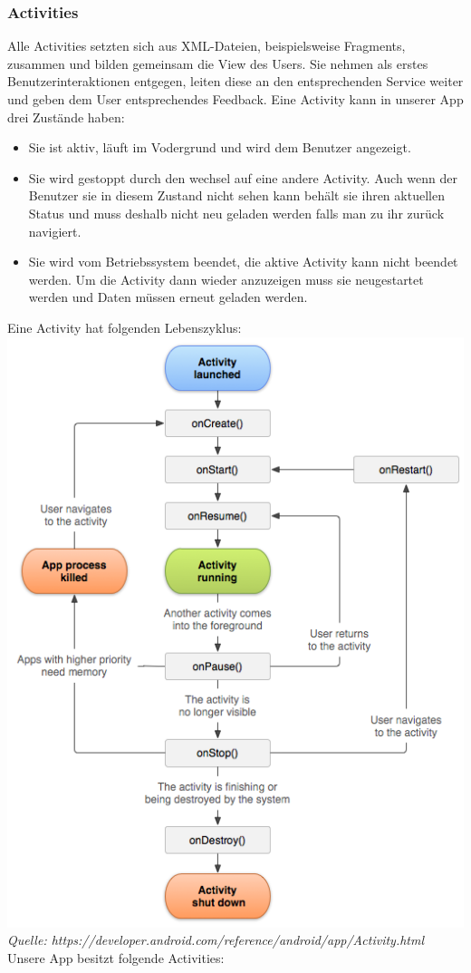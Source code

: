 	\subsubsection{Activities}
Alle Activities setzten sich aus XML-Dateien, beispielsweise Fragments, zusammen und bilden gemeinsam die View des Users.
Sie nehmen als erstes Benutzerinteraktionen entgegen, leiten diese an den entsprechenden Service weiter und geben dem User entsprechendes Feedback.
\newline Eine Activity kann in unserer App drei Zustände haben:
\begin{itemize}
\item Sie ist aktiv, läuft im Vodergrund und wird dem Benutzer angezeigt.
\item Sie wird gestoppt durch den wechsel auf eine andere Activity. Auch wenn der Benutzer sie in diesem Zustand nicht sehen kann behält sie ihren aktuellen Status und muss deshalb nicht neu geladen werden falls man zu ihr zurück navigiert.
\item Sie wird vom Betriebssystem beendet, die aktive Activity kann nicht beendet werden.  Um die Activity dann wieder anzuzeigen muss sie neugestartet werden und Daten müssen erneut geladen werden.
\end{itemize}
Eine Activity hat folgenden Lebenszyklus:\newline
\includegraphics[width=.9\textwidth]{activity_lifecycle.png}
\textit{Quelle: https://developer.android.com/reference/android/app/Activity.html}
Unsere App besitzt folgende Activities:
\newline

